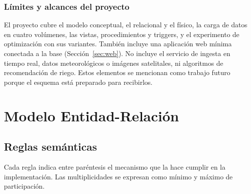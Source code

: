 \documentclass[11pt,letterpaper]{article}
\begin{document}
\subsubsection{Límites y alcances del proyecto}

El proyecto cubre el modelo conceptual, el relacional y el físico, la carga de datos en cuatro volúmenes, las vistas, procedimientos y triggers, y el experimento de optimización con sus variantes. También incluye una aplicación web mínima conectada a la base (Sección~\ref{sec:web}). No incluye el servicio de ingesta en tiempo real, datos meteorológicos o imágenes satelitales, ni algoritmos de recomendación de riego. Estos elementos se mencionan como trabajo futuro porque el esquema está preparado para recibirlos.

\section{Modelo Entidad-Relación}

\subsection{Reglas semánticas}

Cada regla indica entre paréntesis el mecanismo que la hace cumplir en la implementación. Las multiplicidades se expresan como mínimo y máximo de participación.
\end{document}
